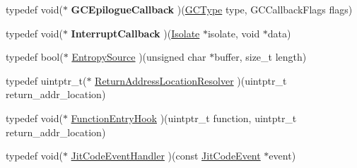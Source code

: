 \begin{DoxyCompactItemize}
\item 
\hypertarget{namespacev8_a220aa1e29ecc75f460d8dbd765b66435}{typedef void($\ast$ {\bfseries G\-C\-Epilogue\-Callback} )(\hyperlink{namespacev8_ac109d6f27e0c0f9ef4e98bcf7a806cf2}{G\-C\-Type} type, G\-C\-Callback\-Flags flags)}\label{namespacev8_a220aa1e29ecc75f460d8dbd765b66435}

\item 
\hypertarget{namespacev8_a57d145e05867d11312177af08dea27a6}{typedef void($\ast$ {\bfseries Interrupt\-Callback} )(\hyperlink{classv8_1_1Isolate}{Isolate} $\ast$isolate, void $\ast$data)}\label{namespacev8_a57d145e05867d11312177af08dea27a6}

\item 
typedef bool($\ast$ \hyperlink{namespacev8_a3a9840e090970cbda2427cf6f5594fba}{Entropy\-Source} )(unsigned char $\ast$buffer, size\-\_\-t length)
\item 
typedef uintptr\-\_\-t($\ast$ \hyperlink{namespacev8_ada64a30dd6abd8c4cbf34503cb4d3a7a}{Return\-Address\-Location\-Resolver} )(uintptr\-\_\-t return\-\_\-addr\-\_\-location)
\item 
typedef void($\ast$ \hyperlink{namespacev8_ad971c67718652f0d12cac5c0a0161e6c}{Function\-Entry\-Hook} )(uintptr\-\_\-t function, uintptr\-\_\-t return\-\_\-addr\-\_\-location)
\item 
typedef void($\ast$ \hyperlink{namespacev8_a20e628e93f848c3350dcd4e49992bae6}{Jit\-Code\-Event\-Handler} )(const \hyperlink{structv8_1_1JitCodeEvent}{Jit\-Code\-Event} $\ast$event)
\end{DoxyCompactItemize}
